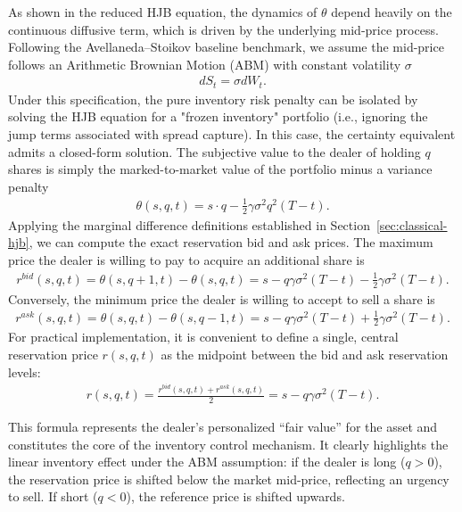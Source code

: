 As shown in the reduced HJB equation, the dynamics of $\theta$ depend heavily on the continuous diffusive term, which is driven by the underlying mid-price process. Following the Avellaneda--Stoikov baseline benchmark, we assume the mid-price follows an Arithmetic Brownian Motion (ABM) with constant volatility $\sigma$
\begin{align*}
    dS_t = \sigma dW_t.
\end{align*}
Under this specification, the pure inventory risk penalty can be isolated by solving the HJB equation for a "frozen inventory" portfolio (i.e., ignoring the jump terms associated with spread capture). In this case, the certainty equivalent admits a closed-form solution. The subjective value to the dealer of holding $q$ shares is simply the marked-to-market value of the portfolio minus a variance penalty
\begin{align*}
    \theta(s,q,t) = s \cdot q - \frac{1}{2}\gamma\sigma^2 q^2 (T-t).
\end{align*}
Applying the marginal difference definitions established in Section~\ref{sec:classical-hjb}, we can compute the exact reservation bid and ask prices. The maximum price the dealer is willing to pay to acquire an additional share is
\begin{align*}
    r^{bid}(s,q,t) = \theta(s,q+1,t) - \theta(s,q,t) = s - q\gamma\sigma^2(T-t) - \frac{1}{2}\gamma\sigma^2(T-t).
\end{align*}
Conversely, the minimum price the dealer is willing to accept to sell a share is
\begin{align*}
    r^{ask}(s,q,t) = \theta(s,q,t) - \theta(s,q-1,t) = s - q\gamma\sigma^2(T-t) + \frac{1}{2}\gamma\sigma^2(T-t).
\end{align*}
For practical implementation, it is convenient to define a single, central reservation price $r(s,q,t)$ as the midpoint between the bid and ask reservation levels:
\begin{align*}
    r(s,q,t) = \frac{r^{bid}(s,q,t) + r^{ask}(s,q,t)}{2} = s - q\gamma\sigma^2(T-t).
\end{align*}

This formula represents the dealer's personalized ``fair value'' for the asset and constitutes the core of the inventory control mechanism. It clearly highlights the linear inventory effect under the ABM assumption: if the dealer is long ($q > 0$), the reservation price is shifted below the market mid-price, reflecting an urgency to sell. If short ($q < 0$), the reference price is shifted upwards. 

